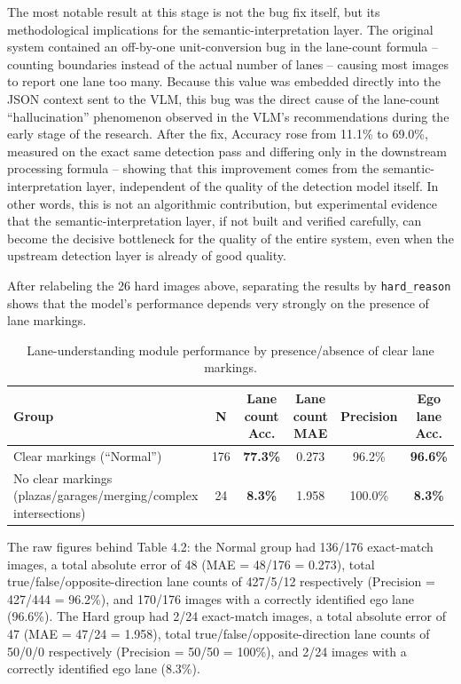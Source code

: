 \documentclass[12pt,a4paper]{report}
\begin{document}
The most notable result at this stage is not the bug fix itself, but its methodological implications for the semantic-interpretation layer. The original system contained an off-by-one unit-conversion bug in the lane-count formula -- counting boundaries instead of the actual number of lanes -- causing most images to report one lane too many. Because this value was embedded directly into the JSON context sent to the VLM, this bug was the direct cause of the lane-count ``hallucination'' phenomenon observed in the VLM's recommendations during the early stage of the research. After the fix, Accuracy rose from 11.1\% to 69.0\%, measured on the exact same detection pass and differing only in the downstream processing formula -- showing that this improvement comes from the semantic-interpretation layer, independent of the quality of the detection model itself. In other words, this is not an algorithmic contribution, but experimental evidence that the semantic-interpretation layer, if not built and verified carefully, can become the decisive bottleneck for the quality of the entire system, even when the upstream detection layer is already of good quality.

After relabeling the 26 hard images above, separating the results by \texttt{hard\_reason} shows that the model's performance depends very strongly on the presence of lane markings.

\begin{table}[htbp]
    \centering
    \small
    \caption{Lane-understanding module performance by presence/absence of clear lane markings.}
    \label{tab:4.2}
    \begin{tabularx}{\linewidth}{@{}Xcccc c@{}}
        \toprule
        \textbf{Group} & \textbf{N} & \textbf{Lane count Acc.} & \textbf{Lane count MAE} & \textbf{Precision} & \textbf{Ego lane Acc.} \\
        \midrule
        Clear markings (``Normal'') & 176 & \textbf{77.3\%} & 0.273 & 96.2\% & \textbf{96.6\%} \\
        No clear markings (plazas/garages/merging/complex intersections) & 24 & \textbf{8.3\%} & 1.958 & 100.0\% & \textbf{8.3\%} \\
        \bottomrule
    \end{tabularx}
\end{table}

The raw figures behind Table 4.2: the Normal group had 136/176 exact-match images, a total absolute error of 48 (MAE = 48/176 = 0.273), total true/false/opposite-direction lane counts of 427/5/12 respectively (Precision = 427/444 = 96.2\%), and 170/176 images with a correctly identified ego lane (96.6\%). The Hard group had 2/24 exact-match images, a total absolute error of 47 (MAE = 47/24 = 1.958), total true/false/opposite-direction lane counts of 50/0/0 respectively (Precision = 50/50 = 100\%), and 2/24 images with a correctly identified ego lane (8.3\%).
\end{document}
